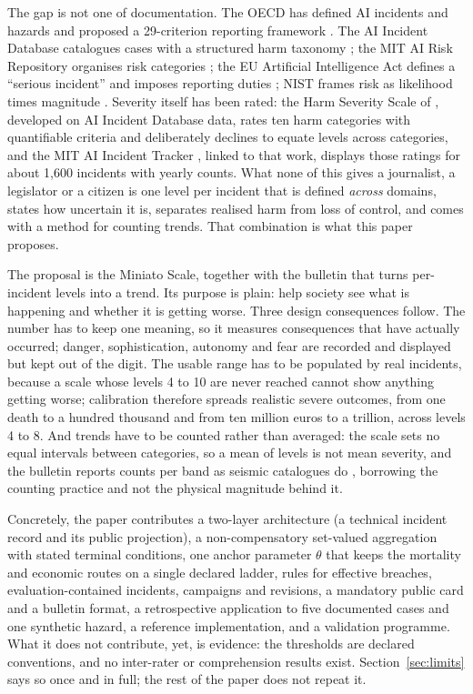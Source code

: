 \documentclass[11pt,a4paper]{article}
\begin{document}
The gap is not one of documentation. The OECD has defined AI incidents and hazards \citep{oecd2024incidents} and proposed a 29-criterion reporting framework \citep{oecd2025reporting}. The AI Incident Database catalogues cases \citep{mcgregor2021aiid} with a structured harm taxonomy \citep{hoffmann2023harm}; the MIT AI Risk Repository organises risk categories \citep{slattery2024repository}; the EU Artificial Intelligence Act defines a ``serious incident'' and imposes reporting duties \citep{euaiact2024}; NIST frames risk as likelihood times magnitude \citep{nist2023airmf,nist2024genai}. Severity itself has been rated: the Harm Severity Scale of \citet{mylius2025}, developed on AI Incident Database data, rates ten harm categories with quantifiable criteria and deliberately declines to equate levels across categories, and the MIT AI Incident Tracker \citep{mitaitracker}, linked to that work, displays those ratings for about 1,600 incidents with yearly counts. What none of this gives a journalist, a legislator or a citizen is one level per incident that is defined \emph{across} domains, states how uncertain it is, separates realised harm from loss of control, and comes with a method for counting trends. That combination is what this paper proposes.

The proposal is the Miniato Scale, together with the bulletin that turns per-incident levels into a trend. Its purpose is plain: help society see what is happening and whether it is getting worse. Three design consequences follow. The number has to keep one meaning, so it measures consequences that have actually occurred; danger, sophistication, autonomy and fear are recorded and displayed but kept out of the digit. The usable range has to be populated by real incidents, because a scale whose levels 4 to 10 are never reached cannot show anything getting worse; calibration therefore spreads realistic severe outcomes, from one death to a hundred thousand and from ten million euros to a trillion, across levels 4 to 8. And trends have to be counted rather than averaged: the scale sets no equal intervals between categories, so a mean of levels is not mean severity, and the bulletin reports counts per band as seismic catalogues do \citep{gutenberg1944}, borrowing the counting practice and not the physical magnitude behind it.

Concretely, the paper contributes a two-layer architecture (a technical incident record and its public projection), a non-compensatory set-valued aggregation with stated terminal conditions, one anchor parameter $\theta$ that keeps the mortality and economic routes on a single declared ladder, rules for effective breaches, evaluation-contained incidents, campaigns and revisions, a mandatory public card and a bulletin format, a retrospective application to five documented cases and one synthetic hazard, a reference implementation, and a validation programme. What it does not contribute, yet, is evidence: the thresholds are declared conventions, and no inter-rater or comprehension results exist. Section~\ref{sec:limits} says so once and in full; the rest of the paper does not repeat it.
\end{document}
